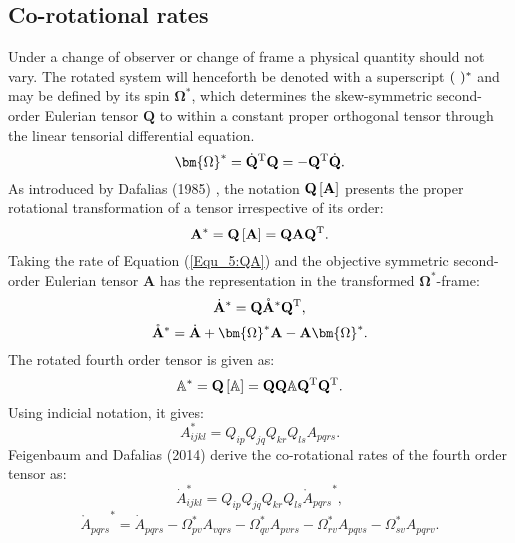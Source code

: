 \subsection{Co-rotational rates}
\noindent
Under a change of observer or change of frame a physical quantity should not vary.
The rotated system will henceforth be denoted with a superscript $(\rm{\ })^*$ and may be defined by its spin $\bm{\Omega}^*$, which determines the skew-symmetric second-order Eulerian tensor $\mathbf{Q}$ to within a constant proper orthogonal tensor through the linear tensorial differential equation.
\begin{equation}
{{\bm{\Omega }}^*} = {{{\dot {\bf{Q}}}}^{\rm{T}}}{\bf{Q}} =  - {{\bf{Q}}^{\rm{T}}}{\dot {\bf{Q}}}.
\end{equation}
As introduced by Dafalias (1985) \cite{dafalias1985plastic}, the notation ${\bf{Q}}\left[ {\bf{A}} \right]$ presents the proper rotational transformation of a tensor irrespective of its order:
\begin{equation}
\label{Equ_5:QA}
{{\bf{A}}^*} = {\bf{Q}}\left[ {\bf{A}} \right] = {\bf{QA}}{{\bf{Q}}^{\rm{T}}}.
\end{equation}
Taking the rate of Equation (\ref{Equ_5:QA}) and the objective symmetric second-order Eulerian tensor ${\mathbf{A}}$ has the representation in the transformed ${{\mathbf{\Omega }}^*}$-frame:
\begin{equation}
{{{\dot {\bf{A}}}}^*} = {\bf{Q}}\mathring {\bf{A}}^* {{\bf{Q}}^{\rm{T}}},
\end{equation}
\begin{equation}
\label{Equ_5:CorotationalRates2ndOrder}
\mathring {\bf{A}}^*   = {\dot {\bf{A}}} + {{\bm{\Omega}}^*}{\bf{A}} - {\bf{A}}{{\bm{\Omega}}^*}.
\end{equation}
The rotated fourth order tensor is given as:
\begin{equation}
{\mathbb{A}^*} = {\bf{Q}}\left[ \mathbb{A} \right] = {\bf{QQ}}\mathbb{A}{{\bf{Q}}^{\rm{T}}}{{\bf{Q}}^{\rm{T}}}.
\end{equation}
Using indicial notation, it gives:
\begin{equation}
A_{ijkl}^* = {Q_{ip}}{Q_{jq}}{Q_{kr}}{Q_{ls}}{A_{pqrs}}.
\end{equation}
Feigenbaum and Dafalias (2014) \cite{feigenbaum2014directional} derive the co-rotational rates of the fourth order tensor as:
\begin{equation}
\dot A_{ijkl}^* = {Q_{ip}}{Q_{jq}}{Q_{kr}}{Q_{ls}}{\mathring A _{pqrs}}^*,
\end{equation}
\begin{equation}
{\mathring A _{pqrs}}^* = {{\dot A}_{pqrs}} - \Omega _{pv}^*{A_{vqrs}} - \Omega _{qv}^*{A_{pvrs}} - \Omega _{rv}^*{A_{pqvs}} - \Omega _{sv}^*{A_{pqrv}}.
\end{equation}



